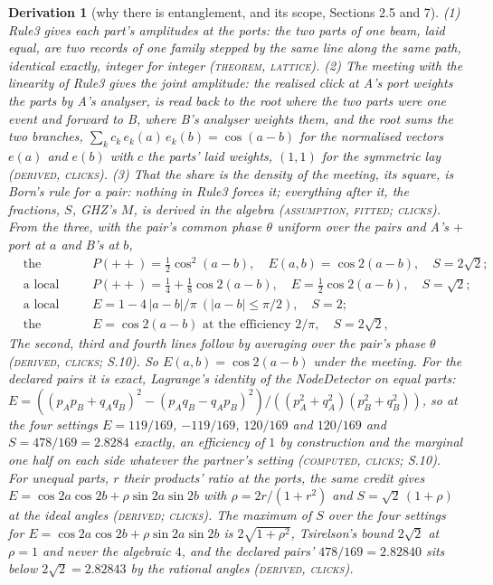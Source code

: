 \documentclass[pdflatex,sn-mathphys-num]{sn-jnl}
\newcommand{\claimmark}[1]{\textup{\textsc{#1}}}
\newcommand{\fence}[1]{\textup{\textsc{#1}}}
\theoremstyle{thmstyleone}
\newtheorem{derivation}{Derivation}
\begin{document}
\begin{derivation}[why there is entanglement, and its scope, Sections 2.5 and 7]
(1) Rule3 gives each part's amplitudes at the ports: the two parts of one beam, laid equal, are two records of one family stepped by the same line along the same path, identical exactly, integer for integer (\claimmark{theorem}, \fence{lattice}). (2) The meeting with the linearity of Rule3 gives the joint amplitude: the realised click at A's port weights the parts by A's analyser, is read back to the root where the two parts were one event and forward to B, where B's analyser weights them, and the root sums the two branches, $\sum_k c_k\,e_k(a)\,e_k(b) = \cos(a - b)$ for the normalised vectors $e(a)$ and $e(b)$ with $c$ the parts' laid weights, $(1, 1)$ for the symmetric lay (\claimmark{derived}, \fence{clicks}). (3) That the share is the density of the meeting, its square, is Born's rule for a pair: nothing in Rule3 forces it; everything after it, the fractions, $S$, GHZ's $M$, is derived in the algebra (\claimmark{assumption}, \claimmark{fitted}; \fence{clicks}). From the three, with the pair's common phase $\theta$ uniform over the pairs and A's $+$ port at $a$ and B's at $b$,
\begin{equation}
\begin{aligned}
&\text{the meeting:} && P(++) = \tfrac{1}{2}\cos^2(a - b), \quad E(a, b) = \cos 2(a - b), \quad S = 2\sqrt 2;\\
&\text{a local credit by the shares:} && P(++) = \tfrac{1}{4} + \tfrac{1}{8}\cos 2(a - b), \quad E = \tfrac{1}{2}\cos 2(a - b), \quad S = \sqrt 2;\\
&\text{a local credit by the sign:} && E = 1 - 4\,|a - b| / \pi \ (|a - b| \le \pi / 2), \quad S = 2;\\
&\text{the credit by the contrast:} && E = \cos 2(a - b) \text{ at the efficiency } 2 / \pi, \quad S = 2\sqrt 2,
\end{aligned}\tag{S.47b}
\end{equation}
The second, third and fourth lines follow by averaging over the pair's phase $\theta$ (\claimmark{derived}, \fence{clicks}; S.10). So $E(a, b) = \cos 2(a - b)$ under the meeting. For the declared pairs it is exact, Lagrange's identity of the NodeDetector on equal parts: $E = ((p_A p_B + q_A q_B)^2 - (p_A q_B - q_A p_B)^2) / ((p_A^2 + q_A^2)(p_B^2 + q_B^2))$, so at the four settings $E = 119 / 169$, $-119 / 169$, $120 / 169$ and $120 / 169$ and $S = 478 / 169 = 2.8284$ exactly, an efficiency of $1$ by construction and the marginal one half on each side whatever the partner's setting (\claimmark{computed}, \fence{clicks}; S.10). For unequal parts, $r$ their products' ratio at the ports, the same credit gives $E = \cos 2a\cos 2b + \rho\sin 2a\sin 2b$ with $\rho = 2r / (1 + r^2)$ and $S = \sqrt 2\,(1 + \rho)$ at the ideal angles (\claimmark{derived}; \fence{clicks}). The maximum of $S$ over the four settings for $E = \cos 2a\cos 2b + \rho\sin 2a\sin 2b$ is $2\sqrt{1 + \rho^2}$, Tsirelson's bound $2\sqrt 2$ at $\rho = 1$ and never the algebraic $4$, and the declared pairs' $478 / 169 = 2.82840$ sits below $2\sqrt 2 = 2.82843$ by the rational angles (\claimmark{derived}, \fence{clicks}).


\end{derivation}
\end{document}
